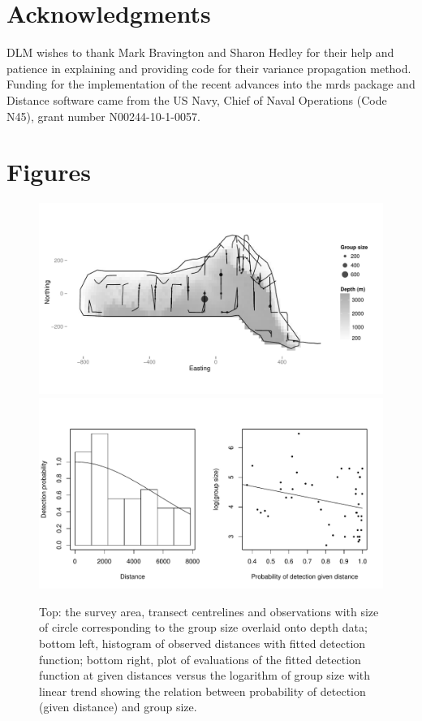 \documentclass[a4paper,12pt]{article}
\begin{document}
\section*{Acknowledgments}

DLM wishes to thank Mark Bravington and Sharon Hedley for their help and patience in explaining and providing code for their variance propagation method. Funding for the implementation of the recent advances into the mrds package and Distance software came from the US Navy, Chief of Naval Operations (Code N45), grant number N00244-10-1-0057.

\newpage




\newpage


\newpage


\section*{Figures}

\begin{figure}[h!]
  \caption{Top: the survey area, transect centrelines and observations with size of circle corresponding to the group size overlaid onto depth data; bottom left, histogram of observed distances with fitted detection function; bottom right, plot of evaluations of the fitted detection function at given distances versus the logarithm of group size with linear trend showing the relation between probability of detection (given distance) and group size.}
  \label{dolphin-eda}
  \begin{center}
    \includegraphics[width=\textwidth]{figs/depth-transects}\\
        \includegraphics[width=\textwidth]{figs/distances-groups}
  \end{center}
\end{figure}
\end{document}
